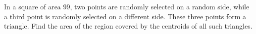 In a square of area $99$, two points are randomly selected on a random side, while a third point is randomly selected on a different side. These three points form a triangle. Find the area of the region covered by the centroids of all such triangles.
